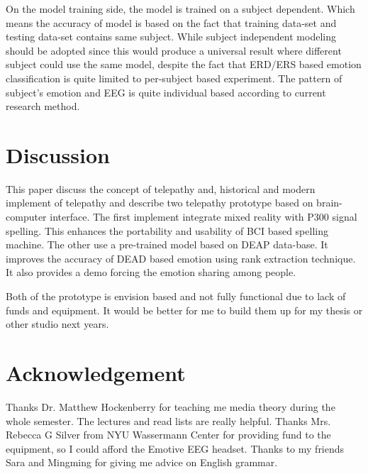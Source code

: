 \documentclass[a4paper]{article}
\begin{document}
On the model training side, the model is trained on a subject dependent. Which means the accuracy of model is based on the fact that training data-set and testing data-set contains same subject. While subject independent modeling should be adopted since this would produce a universal result where different subject could use the same model, despite the fact that ERD/ERS based emotion classification is quite limited to per-subject based experiment. The pattern of subject's emotion and EEG is quite individual based according to current research method.

\section{Discussion}

This paper discuss the concept of telepathy and, historical and modern implement of telepathy and describe two telepathy prototype based on brain-computer interface. The first implement integrate mixed reality with P300 signal spelling. This enhances the portability and usability of BCI based spelling machine. The other use a pre-trained model based on DEAP data-base. It improves the accuracy of DEAD based emotion using rank extraction technique. It also provides a demo forcing the emotion sharing among people. 

Both of the prototype is envision based and not fully functional due to lack of funds and equipment. It would be better for me to build them up for my thesis or other studio next years.

\section{Acknowledgement}

Thanks Dr. Matthew Hockenberry for teaching me media theory during the whole semester. The lectures and read lists are really helpful. Thanks Mrs. Rebecca G Silver from NYU Wassermann Center for providing fund to the equipment, so I could afford the Emotive EEG headset. Thanks to my friends Sara and Mingming for giving me advice on English grammar.

\printbibliography
\end{document}
